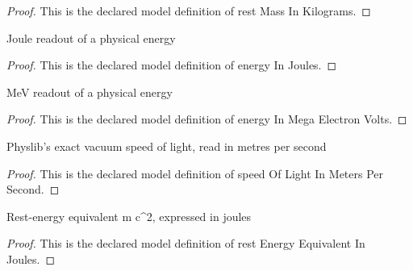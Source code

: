 \begin{proof}
  This is the declared model definition of rest Mass In Kilograms.
\end{proof}
\begin{definition}
  \label{def:physics:phyx-mini-0554:phyxminiproblems-problemphyxmini0554-energyinjoules}
  Joule readout of a physical energy
\end{definition}
\begin{proof}
  This is the declared model definition of energy In Joules.
\end{proof}
\begin{definition}
  \label{def:physics:phyx-mini-0554:phyxminiproblems-problemphyxmini0554-energyinmegaelectronvolts}
  MeV readout of a physical energy
\end{definition}
\begin{proof}
  This is the declared model definition of energy In Mega Electron Volts.
\end{proof}
\begin{definition}
  \label{def:physics:phyx-mini-0554:phyxminiproblems-problemphyxmini0554-speedoflightinmeterspersecond}
  Physlib's exact vacuum speed of light, read in metres per second
\end{definition}
\begin{proof}
  This is the declared model definition of speed Of Light In Meters Per Second.
\end{proof}
\begin{definition}
  \label{def:physics:phyx-mini-0554:phyxminiproblems-problemphyxmini0554-restenergyequivalentinjoules}
  Rest-energy equivalent m c\textasciicircum{}2, expressed in joules
\end{definition}
\begin{proof}
  This is the declared model definition of rest Energy Equivalent In Joules.
\end{proof}
